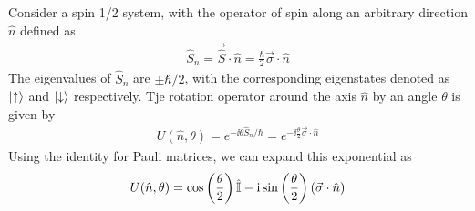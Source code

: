 Consider a spin 1/2 system, with the operator of spin along an arbitrary direction $\hat{n}$ defined as
\begin{align}
    \hat{S}_n = \vec{\hat{S}} \cdot \hat{n} = \frac{\hbar}{2} \vec{\sigma} \cdot \hat{n}
\end{align}
The eigenvalues of $\hat{S}_n$ are $\pm \hbar/2$, with the corresponding eigenstates denoted as $\ket{\uparrow}$ and $\ket{\downarrow}$ respectively. Tje rotation operator around the axis $\hat{n}$ by an angle $\theta$ is given by
\begin{align}
    U(\hat{n}, \theta) = e^{-\ii \theta \hat{S}_n / \hbar} = e^{-\ii \frac{\theta}{2} \vec{\sigma} \cdot \hat{n}}
\end{align}
Using the identity for Pauli matrices, we can expand this exponential as
\begin{align}
    U(\hat{n}, \theta) = \cos\left(\frac{\theta}{2}\right) \hat{\mathbb{I}} - \mathrm{i} \sin\left(\frac{\theta}{2}\right) (\vec{\sigma} \cdot \hat{n})
\end{align}




























